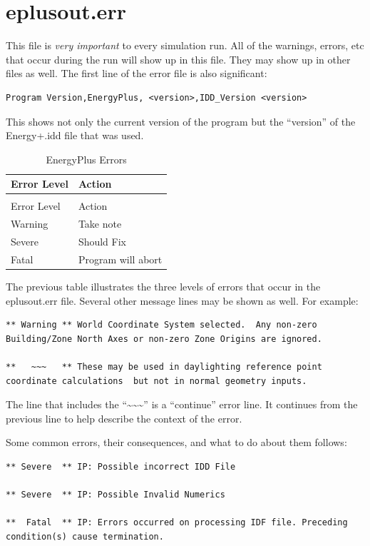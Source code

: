 \section{eplusout.err}

This file is \emph{very important} to every simulation run. All of the warnings, errors, etc that occur during the run will show up in this file. They may show up in other files as well. The first line of the error file is also significant:

\begin{lstlisting}
Program Version,EnergyPlus, <version>,IDD_Version <version>
\end{lstlisting}

This shows not only the current version of the program but the ``version'' of the Energy+.idd file that was used.

\begin{longtable}[c]{@{}ll@{}}
\caption{EnergyPlus Errors \label{table:energyplus-errors}} \tabularnewline
\toprule
Error Level & Action \tabularnewline
\midrule
\endfirsthead

\caption[]{EnergyPlus Errors} \tabularnewline
\toprule
Error Level & Action \tabularnewline
\midrule
\endhead

Warning & Take note \tabularnewline
Severe & Should Fix \tabularnewline
Fatal & Program will abort \tabularnewline
\bottomrule
\end{longtable}

The previous table illustrates the three levels of errors that occur in the eplusout.err file. Several other message lines may be shown as well. For example:

\begin{lstlisting}
** Warning ** World Coordinate System selected.  Any non-zero Building/Zone North Axes or non-zero Zone Origins are ignored.

**   ~~~   ** These may be used in daylighting reference point coordinate calculations  but not in normal geometry inputs.
\end{lstlisting}

The line that includes the ``\~{}\~{}\~{}'' is a ``continue'' error line. It continues from the previous line to help describe the context of the error.

Some common errors, their consequences, and what to do about them follows:

\begin{lstlisting}
** Severe  ** IP: Possible incorrect IDD File

** Severe  ** IP: Possible Invalid Numerics

**  Fatal  ** IP: Errors occurred on processing IDF file. Preceding condition(s) cause termination.
\end{lstlisting}

